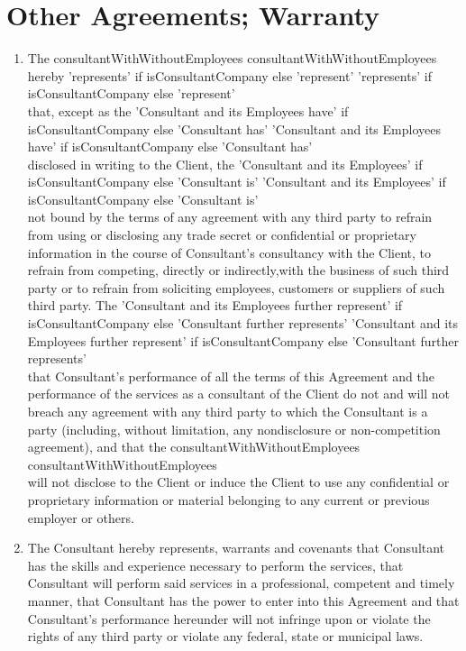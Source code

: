 \documentclass[12pt]{article}
\makeatletter
\edef\history{ }
\newcommand{\VAR}[1]{{\color{blue} #1}\g@addto@macro\history{#1\\}}
\makeatother
\begin{document}
\section{Other Agreements; Warranty}
\begin{enumerate}
    \item The \VAR{ consultantWithWithoutEmployees } hereby
    \VAR{ 'represents' if isConsultantCompany else 'represent'}
    that, except as the
    \VAR{ 'Consultant and its Employees have' if isConsultantCompany else 'Consultant has' }
    disclosed in writing to the Client, the
    \VAR{ 'Consultant and its Employees' if isConsultantCompany else 'Consultant is' }
    not bound by the terms of any agreement with any third party to refrain from using or disclosing any trade secret or confidential or proprietary information in the course of Consultant's consultancy with the Client, to refrain from competing, directly or indirectly,with the business of such third party or to refrain from soliciting employees, customers or suppliers of such third party. The
    \VAR{ 'Consultant and its Employees further represent' if isConsultantCompany else 'Consultant further represents' }
    that Consultant's performance of all the terms of this Agreement and the performance of the services as a consultant of the Client do not and will not breach any agreement with any third party to which the Consultant is a party (including, without limitation, any nondisclosure or non-competition agreement), and that the \VAR{consultantWithWithoutEmployees} will not disclose to the Client or induce the Client to use any confidential or proprietary information or material belonging to any current or previous employer or others.
    \item The Consultant hereby represents, warrants and covenants that Consultant has the skills and experience necessary to perform the services, that Consultant will perform said services in a professional, competent and timely manner, that Consultant has the power to enter into this Agreement and that Consultant's performance hereunder will not infringe upon or violate the rights of any third party or violate any federal, state or municipal laws.
\end{enumerate}
\end{document}
